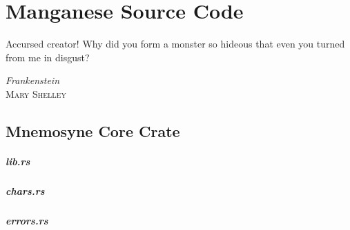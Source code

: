 %
%

\chapter{Manganese Source Code}\label{app:code}

\epigraph{ Accursed creator! Why did you form a monster so hideous that
           even you turned from me in disgust? }%
         { \textit{Frankenstein} \\ \textsc{Mary Shelley} }


\section{Mnemosyne Core Crate}
    \paragraph{lib.rs}
%
    \paragraph{chars.rs}
%
    \paragraph{errors.rs}
%
